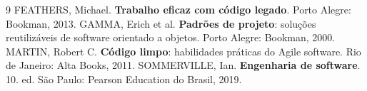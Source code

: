 \begin{thebibliography}{9}\small
{} FEATHERS, Michael. \textbf{Trabalho eficaz com c\'odigo legado}. Porto Alegre: Bookman, 2013.
 GAMMA, Erich et al. \textbf{Padr\~oes de projeto}: solu\c{c}\~oes reutiliz\'aveis de software orientado a objetos. Porto Alegre: Bookman, 2000.
 MARTIN, Robert C. \textbf{C\'odigo limpo}: habilidades pr\'aticas do Agile software. Rio de Janeiro: Alta Books, 2011.
 SOMMERVILLE, Ian. \textbf{Engenharia de software}. 10. ed. S\~ao Paulo: Pearson Education do Brasil, 2019.
\end{thebibliography}

